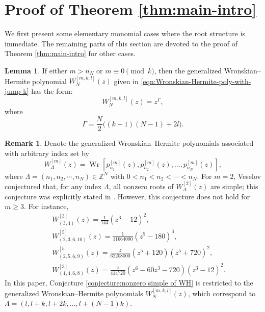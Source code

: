 \documentclass[preprint,3p,10pt]{elsarticle}
\newcommand{\Z}{\mathbb Z}
\DeclareMathOperator{\Wr}{Wr}
\theoremstyle{definition}
\newtheorem{remark}{Remark}[section]
\newtheorem{lemma}{Lemma}[section]
\begin{document}
\section{Proof of Theorem \ref{thm:main-intro}}\label{sec:proof of main results}

We first present some elementary monomial cases where the root structure is immediate. The remaining parts of this section are devoted to the proof of Theorem \ref{thm:main-intro} for other cases.
\begin{lemma}\label{lem:monomial-cases}
If either \(m>n_N\) or \(m\equiv0\pmod{k}\), then the generalized Wronskian--Hermite polynomial $W_N^{[m,k,l]}(z)$ given in \eqref{eqn:Wronskian-Hermite-poly-with-jump-k} has the form:
\begin{equation}
    W_N^{[m,k,l]}(z)=z^\Gamma,
\end{equation}
where
\begin{equation} \label{def:Gamma}
    \Gamma
    =
    \frac{N}{2}\bigl((k-1)(N-1)+2l\bigr).
\end{equation}
\end{lemma}

\begin{remark}\label{remark:conjecture not true roe arbitrary m}
Denote the generalized Wronskian--Hermite polynomials associated with arbitrary index set by
\begin{equation} \label{Wronskian-Hermite hierarchy}
    W_{\Lambda}^{[m]}(z) = \Wr \!\left[
        p_{n_1}^{[m]}(z),p_{n_2}^{[m]}(z),\ldots,p_{n_N}^{[m]}(z)
    \right],
\end{equation}
where $\Lambda=(n_1,n_2,\cdots,n_N) \in \Z^N$ with $0< n_1<n_2<\cdots<n_N$. For \(m=2\), Veselov conjectured that, for any index $\Lambda$, all nonzero roots of \(W_{\Lambda}^{[2]}(z)\) are
simple; this conjecture was explicitly stated in
\cite{felder2012zeros}. However, this conjecture does not hold for $m \ge 3$. For instance, 
\begin{eqnarray}
    && W_{(3,4)}^{[3]}(z)=\frac{1}{144} \left(z^3-12\right)^2,\\
       && W_{(2,3,6,10)}^{[5]}(z) = \frac{1}{11664000}\left(z^5-180\right)^3,\\
       && W_{(2,5,6,9)}^{[5]}(z) = \frac{z}{62208000} \left(z^5+120\right) \left(z^5+720\right)^2,\\
       &&  W_{(1,4,6,8)}^{[3]}(z) = \frac{z}{414720} \left(z^6-60 z^3-720\right)\left(z^3-12\right)^2.
\end{eqnarray}
In this paper, Conjecture \ref{conjecture:nonzero simple of WH} is restricted to the generalized Wronskian--Hermite polynomials $W_N^{[m,k,l]}(z)$, which correspond to $\Lambda = (l,l+k,l+2k, \dots, l+(N-1)k)$. 
\end{remark}
\end{document}
